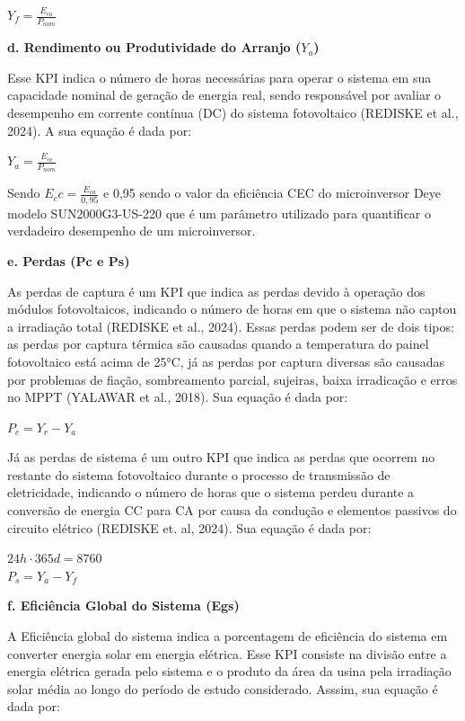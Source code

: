 \begin{center}
    $Y_f = \frac{E_{ca}}{P_{nom}}$
\end{center}

\textbf{d.	Rendimento ou Produtividade do Arranjo ($Y_a$)}

Esse KPI indica o número de horas necessárias para operar o sistema em sua capacidade nominal de geração de energia real, sendo responsável por avaliar o desempenho em corrente contínua (DC) do sistema fotovoltaico (REDISKE et al., 2024). A sua equação é dada por: 

\begin{center}
    $Y_a = \frac{E_{cc}}{P_{nom}}$
\end{center}

Sendo $E_cc= \frac{E_{ca}}{0,95}$ e 0,95 sendo o valor da eficiência CEC do microinversor Deye modelo SUN2000G3-US-220 que é um parâmetro utilizado para quantificar o verdadeiro desempenho de um microinversor.

\textbf{e. Perdas (Pc e Ps)}

As perdas de captura é um KPI que indica as perdas devido à operação dos módulos fotovoltaicos, indicando o número de horas em que o sistema não captou a irradiação total (REDISKE et al., 2024). Essas perdas podem ser de dois tipos: as perdas por captura térmica são causadas quando a temperatura do painel fotovoltaico está acima de 25°C, já as perdas por captura diversas são causadas por problemas de fiação, sombreamento parcial, sujeiras, baixa irradicação e erros no MPPT (YALAWAR et al., 2018). Sua equação é dada por: 

\begin{center}
    $ P_c = Y_r - Y_a$
\end{center}

Já as perdas de sistema é um outro KPI que indica as perdas que ocorrem no restante do sistema fotovoltaico durante o processo de transmissão de eletricidade, indicando o número de horas que o sistema perdeu durante a conversão de energia CC para CA por causa da condução e elementos passivos do circuito elétrico (REDISKE et. al, 2024). Sua equação é dada por: 

\begin{center}
    $ 24h \cdot 365d = 8760$ \\
    $P_s = Y_a - Y_f$
\end{center}

\textbf{f.	Eficiência Global do Sistema (Egs)}

A Eficiência global do sistema indica a porcentagem de eficiência do sistema em converter energia solar em energia elétrica. Esse KPI consiste na divisão entre a energia elétrica gerada pelo sistema e o produto da área da usina pela irradiação solar média ao longo do período de estudo considerado. Asssim, sua equação é dada por: 

